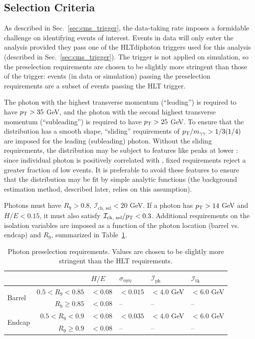 \subsection{Selection Criteria} \label{sec:evt_photon_sel}
As described in Sec.~\ref{sec:cms_trigger}, the data-taking rate imposes a formidable challenge on identifying events of interest.
Events in data will only enter the analysis provided they pass one of the HLTdiphoton triggers used for this analysis (described in Sec.~\ref{sec:cms_trigger}).
The trigger is not applied on simulation, so the preselection requirements are chosen to be slightly more stringent than those of the trigger: events (in data or simulation) passing the preselection requirements are a subset of events passing the HLT trigger.

The photon with the highest transverse momentum (``leading'') is required to have $p_{\mathrm{T}} > 35$ GeV, and the photon with the second highest transverse momentum (``subleading'') is required to have $p_{\mathrm{T}} > 25$ GeV.
To ensure that the \mgg distribution has a smooth shape, ``sliding'' \pT requirements of $p_{\mathrm{T}}/m_{\gamma\gamma} > 1/3 (1/4)$ are imposed for the leading (subleading) photon.
Without the sliding \pT requirements, the \mgg distribution may be subject to features like peaks at lower \mgg: since individual photon \pT is positively correlated with \mgg, fixed \pT requirements reject a greater fraction of low \mgg events.
It is preferable to avoid these features to ensure that the \mgg distribution may be fit by simple analytic functions (the background estimation method, described later, relies on this assumption).

Photons must have $R_9 > 0.8$, $\mathcal I_{\text{ch, sel}} < 20$ GeV.
If a photon has $p_{\mathrm{T}} > 14$ GeV and $H/E < 0.15$, it must also satisfy $\mathcal I_{\text{ch, sel}}/p_{\mathrm{T}} < 0.3$.
Additional requirements on the isolation variables are imposed as a function of the photon location (barrel vs. endcap) and $R_9$, summarized in Table~\ref{tab:photon_presel}.
\begin{table} [h!]
    \centering
    \begin{tabular}{ l r | l | l | l | l } \hline \hline
        & & $H/E$ & $\sigma_{i\eta i\eta}$ & $\mathcal I_{\text{ph}}$ & $\mathcal I_{\text{tk}}$  \\ \hline
        \multirow{2}{*}{Barrel} & $0.5 < R_9 < 0.85$ & $<0.08$ & $<0.015$ & $<4.0$ GeV & $<6.0$ GeV \\
                                & $R_9 \geq 0.85$ & $<0.08$ & -- & -- & -- \\ \hline
        \multirow{2}{*}{Endcap} & $0.5 < R_9 < 0.9$ & $<0.08$ & $<0.035$ & $<4.0$ GeV & $<6.0$ GeV \\
                                & $R_9 \geq 0.9$ & $<0.08$ & -- & -- & -- \\ \hline \hline 
    \end{tabular}
    \caption{Photon preselection requirements. Values are chosen to be slightly more stringent than the HLT requirements.}
    \label{tab:photon_presel}
\end{table}
